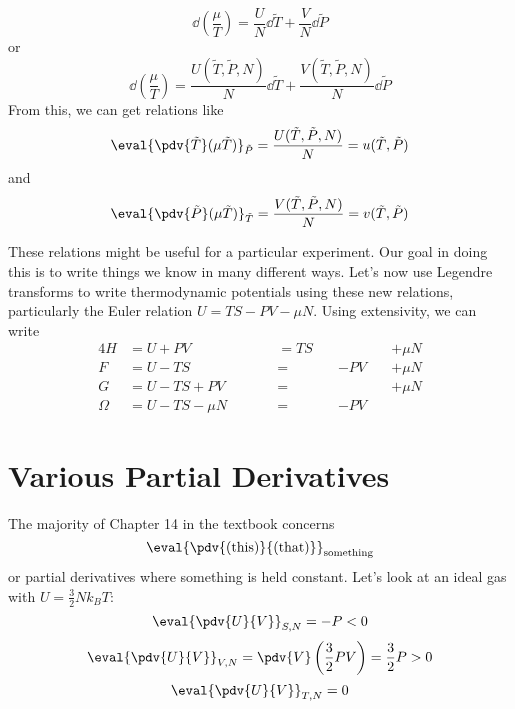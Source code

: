 \documentclass[a4paper,twoside,master.tex]{subfiles}
\begin{document}
\begin{equation}
    \dd{\left( \frac{\mu}{T} \right)} = \frac{U}{N} \dd{\tilde{T}} + \frac{V}{N} \dd{\tilde{P}}
\end{equation}
or
\begin{equation}
    \dd{\left( \frac{\mu}{T} \right)} = \frac{U(\tilde{T}, \tilde{P}, N)}{N} \dd{\tilde{T}} + \frac{V(\tilde{T}, \tilde{P}, N)}{N} \dd{\tilde{P}}
\end{equation}
From this, we can get relations like
\begin{equation}
    \eval{\pdv{\tilde{T}}(\mu \tilde{T})}_{\tilde{P}} = \frac{U(\tilde{T}, \tilde{P}, N)}{N} = u(\tilde{T}, \tilde{P})
\end{equation}
and
\begin{equation}
    \eval{\pdv{\tilde{P}}(\mu \tilde{T})}_{\tilde{T}} = \frac{V(\tilde{T}, \tilde{P}, N)}{N} = v(\tilde{T}, \tilde{P})
\end{equation}

These relations might be useful for a particular experiment. Our goal in doing this is to write things we know in many different ways. Let's now use Legendre transforms to write thermodynamic potentials using these new relations, particularly the Euler relation $ U = TS - PV - \mu N $. Using extensivity, we can write
\begin{alignat}{4}
    H &= U + PV \qquad &&= TS \quad & \quad & +\mu N \\
    F &= U - TS \qquad &&= \quad & -PV \quad & +\mu N\\
    G &= U - TS + PV \qquad &&= \quad & \quad & + \mu N\\
    \Omega &= U - TS - \mu N \qquad &&= \quad & -PV \quad &
\end{alignat}

\section{Various Partial Derivatives}
\label{sec:various_partial_derivatives}

The majority of Chapter 14 in the textbook concerns
\begin{equation}
    \eval{\pdv{(\text{this})}{(\text{that})}}_{\text{something}}
\end{equation}
or partial derivatives where something is held constant. Let's look at an ideal gas with $ U = \frac{3}{2} N k_B T $:
\begin{equation}
    \eval{\pdv{U}{V}}_{S,N} = -P < 0
\end{equation}
\begin{equation}
    \eval{\pdv{U}{V}}_{V,N} = \pdv{V}\left( \frac{3}{2} PV \right) = \frac{3}{2} P > 0
\end{equation}
\begin{equation}
    \eval{\pdv{U}{V}}_{T,N} = 0
\end{equation}
\end{document}
